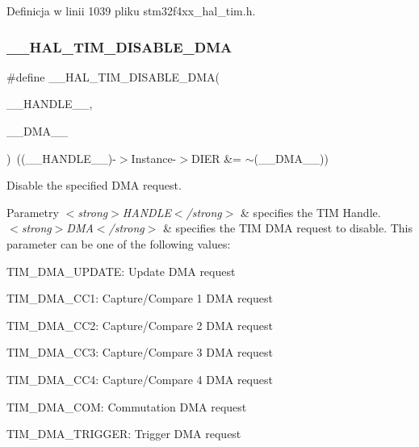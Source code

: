 Definicja w linii 1039 pliku stm32f4xx\+\_\+hal\+\_\+tim.\+h.

\mbox{\label{group___t_i_m___exported___macros_ga1a6e8b19efd23fd0295802d904c4702f}} 
\subsubsection{\texorpdfstring{\+\_\+\+\_\+\+H\+A\+L\+\_\+\+T\+I\+M\+\_\+\+D\+I\+S\+A\+B\+L\+E\+\_\+\+D\+MA}{\_\_HAL\_TIM\_DISABLE\_DMA}}
{\footnotesize\ttfamily \#define \+\_\+\+\_\+\+H\+A\+L\+\_\+\+T\+I\+M\+\_\+\+D\+I\+S\+A\+B\+L\+E\+\_\+\+D\+MA(\begin{DoxyParamCaption}\item[{}]{\+\_\+\+\_\+\+H\+A\+N\+D\+L\+E\+\_\+\+\_\+,  }\item[{}]{\+\_\+\+\_\+\+D\+M\+A\+\_\+\+\_\+ }\end{DoxyParamCaption})~((\+\_\+\+\_\+\+H\+A\+N\+D\+L\+E\+\_\+\+\_\+)-\/$>$Instance-\/$>$D\+I\+ER \&= $\sim$(\+\_\+\+\_\+\+D\+M\+A\+\_\+\+\_\+))}



Disable the specified D\+MA request. 


\begin{DoxyParams}{Parametry}
{\em $<$strong$>$\+H\+A\+N\+D\+L\+E$<$/strong$>$} & specifies the T\+IM Handle. \\
\hline
{\em $<$strong$>$\+D\+M\+A$<$/strong$>$} & specifies the T\+IM D\+MA request to disable. This parameter can be one of the following values\+: \begin{DoxyItemize}
\item T\+I\+M\+\_\+\+D\+M\+A\+\_\+\+U\+P\+D\+A\+TE\+: Update D\+MA request \item T\+I\+M\+\_\+\+D\+M\+A\+\_\+\+C\+C1\+: Capture/\+Compare 1 D\+MA request \item T\+I\+M\+\_\+\+D\+M\+A\+\_\+\+C\+C2\+: Capture/\+Compare 2 D\+MA request \item T\+I\+M\+\_\+\+D\+M\+A\+\_\+\+C\+C3\+: Capture/\+Compare 3 D\+MA request \item T\+I\+M\+\_\+\+D\+M\+A\+\_\+\+C\+C4\+: Capture/\+Compare 4 D\+MA request \item T\+I\+M\+\_\+\+D\+M\+A\+\_\+\+C\+OM\+: Commutation D\+MA request \item T\+I\+M\+\_\+\+D\+M\+A\+\_\+\+T\+R\+I\+G\+G\+ER\+: Trigger D\+MA request \end{DoxyItemize}
\\
\hline
\end{DoxyParams}

